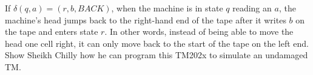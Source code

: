 \documentclass[11pt]{article}
\begin{document}
\begin{enumerate}
If $\delta(q, a) = (r, b,BACK)$, when the machine is in state $q$ reading an $a$, the machine's head jumps back to the right-hand end of the tape after it writes $b$ on the tape and enters state $r$. In other words, instead of being able to move the head one cell right, it can only move back to the start of the tape on the left end. Show Sheikh Chilly how he can program this TM202x to simulate an undamaged TM. 

\end{enumerate}
\end{document}
